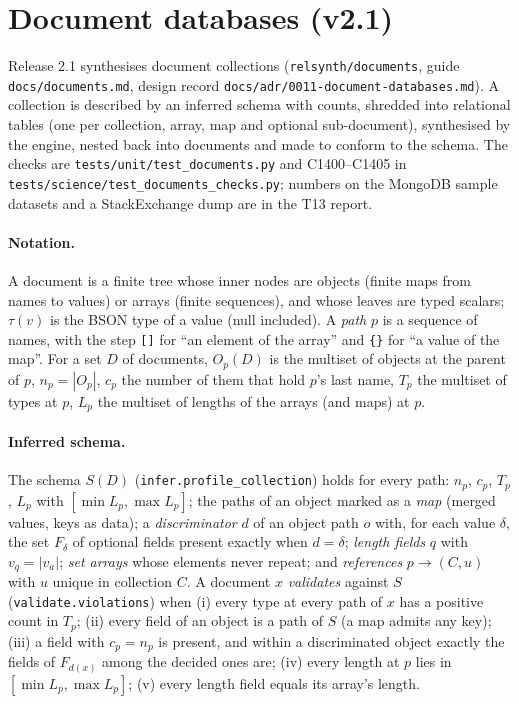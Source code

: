 \section{Document databases (v2.1)}\label{sec:v40docs}
\setcounter{savedpropdoc}{\value{proposition}}
\setcounter{proposition}{1399}
Release 2.1 synthesises document collections (\texttt{relsynth/documents}, guide \texttt{docs/documents.md},
design record \texttt{docs/adr/0011-document-databases.md}). A collection is described by an inferred schema with
counts, shredded into relational tables (one per collection, array, map and optional sub-document), synthesised by
the engine, nested back into documents and made to conform to the schema. The checks are
\texttt{tests/unit/test\_documents.py} and C1400--C1405 in \texttt{tests/science/test\_documents\_checks.py};
numbers on the MongoDB sample datasets and a StackExchange dump are in the T13 report.

\paragraph{Notation.} A document is a finite tree whose inner nodes are objects (finite maps from names to values)
or arrays (finite sequences), and whose leaves are typed scalars; $\tau(v)$ is the BSON type of a value (null
included). A \emph{path} $p$ is a sequence of names, with the step \texttt{[]} for ``an element of the array'' and
\texttt{\{\}} for ``a value of the map''. For a set $D$ of documents, $O_p(D)$ is the multiset of objects at the
parent of $p$, $n_p=|O_p|$, $c_p$ the number of them that hold $p$'s last name, $T_p$ the multiset of types at
$p$, $L_p$ the multiset of lengths of the arrays (and maps) at $p$.

\paragraph{Inferred schema.} The schema $S(D)$ (\texttt{infer.profile\_collection}) holds for every path: $n_p$,
$c_p$, $T_p$, $L_p$ with $[\min L_p,\max L_p]$; the paths of an object marked as a \emph{map} (merged values, keys as
data); a \emph{discriminator} $d$ of an object path $o$ with, for each value $\delta$, the set $F_\delta$ of
optional fields present exactly when $d=\delta$; \emph{length fields} $q$ with $v_q=|v_a|$; \emph{set arrays}
whose elements never repeat; and \emph{references} $p\to(C,u)$ with $u$ unique in collection $C$. A document $x$
\emph{validates} against $S$ (\texttt{validate.violations}) when (i) every type at every path of $x$ has a
positive count in $T_p$; (ii) every field of an object is a path of $S$ (a map admits any key); (iii) a field with
$c_p=n_p$ is present, and within a discriminated object exactly the fields of $F_{d(x)}$ among the decided ones
are; (iv) every length at $p$ lies in $[\min L_p,\max L_p]$; (v) every length field equals its array's length.

